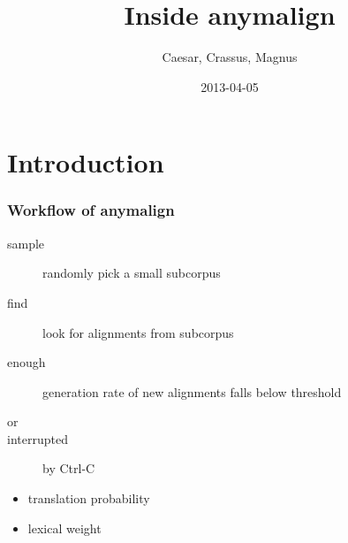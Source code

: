 

\date{2013-04-05} %
\title{Inside anymalign}
\author{Caesar, Crassus, Magnus }



\section{Introduction}{
  \begin{frame}
    \titlepage
  \end{frame}

  \begin{frame}
    \frametitle{Workflow of anymalign}
    \begin{algorithmic}
      \Repeat
        \begin{description}
          \item[sample] randomly pick a small subcorpus
          \item[find]   look for alignments from subcorpus
        \end{description}
      \Until
        \begin{description}
          \item[enough] generation rate of new alignments falls below threshold
          \item[or]
          \item[interrupted] by Ctrl-C
        \end{description}
      \Return
        \begin{itemize}
          \item translation probability
          \item lexical weight
        \end{itemize}
    \end{algorithmic}
  \end{frame}
}

